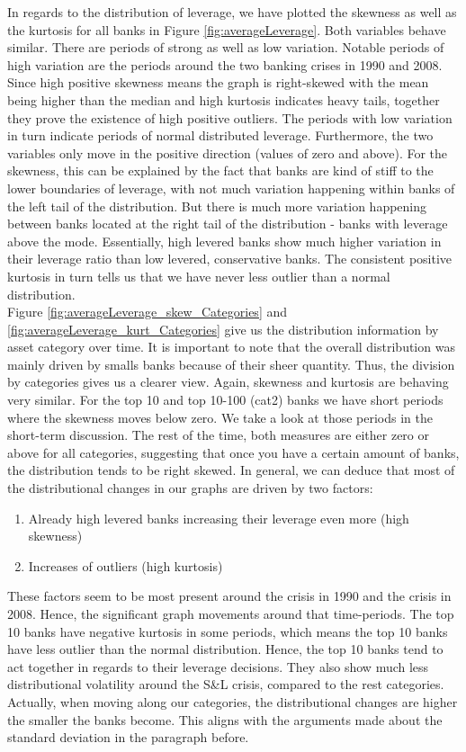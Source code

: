 \documentclass[12pt, a4paper]{article} %
\begin{document}
In regards to the distribution of leverage, we have plotted the skewness as well as the kurtosis for all banks in Figure \ref{fig:averageLeverage}. Both variables behave similar. There are periods of strong as well as low variation. Notable periods of high variation are the periods around the two banking crises in 1990 and 2008. Since high positive skewness means the graph is right-skewed with the mean being higher than the median and high kurtosis indicates heavy tails, together they prove the existence of high positive outliers. The periods with low variation in turn indicate periods of normal distributed leverage. Furthermore, the two variables only move in the positive direction (values of zero and above). For the skewness, this can be explained by the fact that banks are kind of stiff to the lower boundaries of leverage, with not much variation happening within banks of the left tail of the distribution. But there is much more variation happening between banks located at the right tail of the distribution - banks with leverage above the mode. Essentially, high levered banks show much higher variation in their leverage ratio than low levered, conservative banks. The consistent positive kurtosis in turn tells us that we have never less outlier than a normal distribution.\\
Figure \ref{fig:averageLeverage_skew_Categories} and \ref{fig:averageLeverage_kurt_Categories} give us the distribution information by asset category over time. It is important to note that the overall distribution was mainly driven by smalls banks because of their sheer quantity. Thus, the division by categories gives us a clearer view. Again, skewness and kurtosis are behaving very similar. For the top 10 and top 10-100 (cat2) banks we have short periods where the skewness moves below zero. We take a look at those periods in the short-term discussion. The rest of the time, both measures are either zero or above for all categories, suggesting that once you have a certain amount of banks, the distribution tends to be right skewed. 
In general, we can deduce that most of the distributional changes in our graphs are driven by two factors:
\begin{enumerate}
\item Already high levered banks increasing their leverage even more (high skewness)
\item Increases of outliers (high kurtosis)
\end{enumerate}
These factors seem to be most present around the crisis in 1990 and the crisis in 2008. Hence, the significant graph movements around that time-periods.
The top 10 banks have negative kurtosis in some periods, which means the top 10 banks have less outlier than the normal distribution. Hence, the top 10 banks tend to act together in regards to their leverage decisions. 
They also show much less distributional volatility around the S\&L crisis, compared to the rest categories. Actually, when moving along our categories, the distributional changes are higher the smaller the banks become. This aligns with the arguments made about the standard deviation in the paragraph before.
\end{document}

